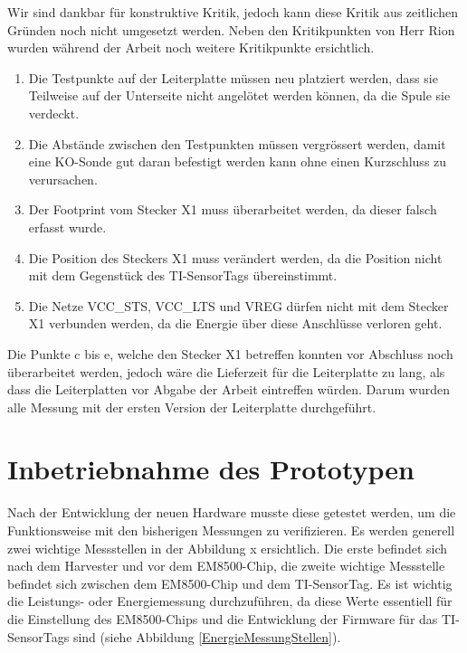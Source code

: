 Wir sind dankbar für konstruktive Kritik, jedoch kann diese Kritik aus zeitlichen Gründen noch nicht umgesetzt werden. Neben den Kritikpunkten von Herr Rion wurden während der Arbeit noch weitere Kritikpunkte ersichtlich.

\begin{enumerate}
    \item Die Testpunkte auf der Leiterplatte müssen neu platziert werden, dass sie Teilweise auf der Unterseite nicht angelötet werden können, da die Spule sie verdeckt. 
    \item Die Abstände zwischen den Testpunkten müssen vergrössert werden, damit eine KO-Sonde gut daran befestigt werden kann ohne einen Kurzschluss zu verursachen.
    \item Der Footprint vom Stecker X1 muss überarbeitet werden, da dieser falsch erfasst wurde.
	\item Die Position des Steckers X1 muss verändert werden, da die Position nicht mit dem Gegenstück des TI-SensorTags übereinstimmt.
	\item Die Netze VCC\_STS, VCC\_LTS und VREG dürfen nicht mit dem Stecker X1 verbunden werden, da die Energie über diese Anschlüsse verloren geht.
\end{enumerate}

Die Punkte c bis e, welche den Stecker X1 betreffen konnten vor Abschluss noch überarbeitet werden, jedoch wäre die Lieferzeit für die Leiterplatte zu lang, als dass die Leiterplatten vor Abgabe der Arbeit eintreffen würden. Darum wurden alle Messung mit der ersten Version der Leiterplatte durchgeführt.


\section{Inbetriebnahme des Prototypen}
Nach der Entwicklung der neuen Hardware musste diese getestet werden, um die Funktionsweise mit den bisherigen Messungen zu verifizieren. Es werden generell zwei wichtige Messstellen in der Abbildung x ersichtlich. Die erste befindet sich nach dem Harvester und vor dem EM8500-Chip, die zweite wichtige Messstelle befindet sich zwischen dem EM8500-Chip und dem TI-SensorTag. Es ist wichtig die Leistungs- oder Energiemessung durchzuführen, da diese Werte essentiell für die Einstellung des EM8500-Chips und die Entwicklung der Firmware für das TI-SensorTags sind (siehe Abbildung \ref{EnergieMessungStellen}). 

